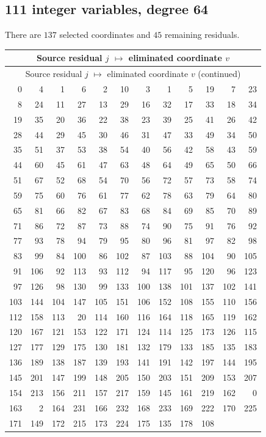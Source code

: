 \subsection{111 integer variables, degree 64}
There are $137$ selected coordinates and $45$ remaining residuals.
\begingroup
\small
\setlength{\tabcolsep}{4pt}
\begin{longtable}{*{6}{r@{\,$\mapsto$\,}r}}
\hline
\multicolumn{12}{c}{Source residual $j$ $\mapsto$ eliminated coordinate $v$}\\
\hline
\endfirsthead
\hline
\multicolumn{12}{c}{Source residual $j$ $\mapsto$ eliminated coordinate $v$ (continued)}\\
\hline
\endhead
0 & 4 & 1 & 6 & 2 & 10 & 3 & 1 & 5 & 19 & 7 & 23 \\
8 & 24 & 11 & 27 & 13 & 29 & 16 & 32 & 17 & 33 & 18 & 34 \\
19 & 35 & 20 & 36 & 22 & 38 & 23 & 39 & 25 & 41 & 26 & 42 \\
28 & 44 & 29 & 45 & 30 & 46 & 31 & 47 & 33 & 49 & 34 & 50 \\
35 & 51 & 37 & 53 & 38 & 54 & 40 & 56 & 42 & 58 & 43 & 59 \\
44 & 60 & 45 & 61 & 47 & 63 & 48 & 64 & 49 & 65 & 50 & 66 \\
51 & 67 & 52 & 68 & 54 & 70 & 56 & 72 & 57 & 73 & 58 & 74 \\
59 & 75 & 60 & 76 & 61 & 77 & 62 & 78 & 63 & 79 & 64 & 80 \\
65 & 81 & 66 & 82 & 67 & 83 & 68 & 84 & 69 & 85 & 70 & 89 \\
71 & 86 & 72 & 87 & 73 & 88 & 74 & 90 & 75 & 91 & 76 & 92 \\
77 & 93 & 78 & 94 & 79 & 95 & 80 & 96 & 81 & 97 & 82 & 98 \\
83 & 99 & 84 & 100 & 86 & 102 & 87 & 103 & 88 & 104 & 90 & 105 \\
91 & 106 & 92 & 113 & 93 & 112 & 94 & 117 & 95 & 120 & 96 & 123 \\
97 & 126 & 98 & 130 & 99 & 133 & 100 & 138 & 101 & 137 & 102 & 141 \\
103 & 144 & 104 & 147 & 105 & 151 & 106 & 152 & 108 & 155 & 110 & 156 \\
112 & 158 & 113 & 20 & 114 & 160 & 116 & 164 & 118 & 165 & 119 & 162 \\
120 & 167 & 121 & 153 & 122 & 171 & 124 & 114 & 125 & 173 & 126 & 115 \\
127 & 177 & 129 & 175 & 130 & 181 & 132 & 179 & 133 & 185 & 135 & 183 \\
136 & 189 & 138 & 187 & 139 & 193 & 141 & 191 & 142 & 197 & 144 & 195 \\
145 & 201 & 147 & 199 & 148 & 205 & 150 & 203 & 151 & 209 & 153 & 207 \\
154 & 213 & 156 & 211 & 157 & 217 & 159 & 145 & 161 & 219 & 162 & 0 \\
163 & 2 & 164 & 231 & 166 & 232 & 168 & 233 & 169 & 222 & 170 & 225 \\
171 & 149 & 172 & 215 & 173 & 224 & 175 & 135 & 178 & 108 & \multicolumn{2}{c}{} \\
\hline
\end{longtable}
\endgroup

